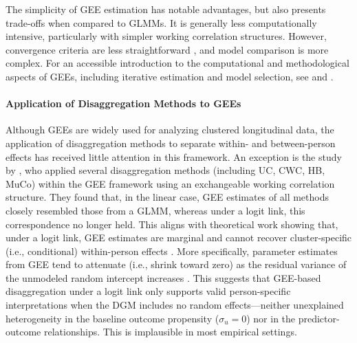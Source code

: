 \documentclass[stu]{apa7}
\begin{document}
The simplicity of GEE estimation has notable advantages, but also presents trade-offs when compared to GLMMs. It is generally less computationally intensive, particularly with simpler working correlation structures. However, convergence criteria are less straightforward \parencite[see][p. 92]{hardin_generalized_2012}, and model comparison is more complex. For an accessible introduction to the computational and methodological aspects of GEEs, including iterative estimation and model selection, see \textcite{mcneish_unnecessary_2017} and \textcite{ballinger_using_2004}.



\paragraph{Application of Disaggregation Methods to GEEs}

Although GEEs are widely used for analyzing clustered longitudinal data, the application of disaggregation methods to separate within- and between-person effects has received little attention in this framework. An exception is the study by \textcite{begg_separation_2003}, who applied several disaggregation methods (including UC, CWC, HB, MuCo) within the GEE framework using an exchangeable working correlation structure. They found that, in the linear case, GEE estimates of all methods closely resembled those from a GLMM, whereas under a logit link, this correspondence no longer held. This aligns with theoretical work showing that, under a logit link, GEE estimates are marginal and cannot recover cluster-specific (i.e., conditional) within-person effects \parencite{neuhaus_comparison_1991}. More specifically, parameter estimates from GEE tend to attenuate (i.e., shrink toward zero) as the residual variance of the unmodeled random intercept increases \parencite[For an illustration of this, see \href{https://wardeiling.shinyapps.io/GLMM_population-averaged-and-person-specific-interpretations/}{wardeiling.shinyapps.io/GLMM\_population-averaged-and-person-specific-interpretations};][]{neuhaus_comparison_1991, begg_separation_2003}. This suggests that GEE-based disaggregation under a logit link only supports valid person-specific interpretations when the DGM includes no random effects—neither unexplained heterogeneity in the baseline outcome propensity ($\sigma_u = 0$) nor in the predictor-outcome relationships. This is implausible in most empirical settings.
\end{document}
